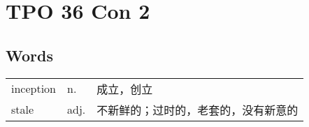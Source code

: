 \section{TPO 36 Con 2}

\subsection{Words}

\begin{tabular}{lll}
    inception & n.   & 成立，创立              \\
    stale     & adj. & 不新鲜的；过时的，老套的，没有新意的 \\
\end{tabular}
